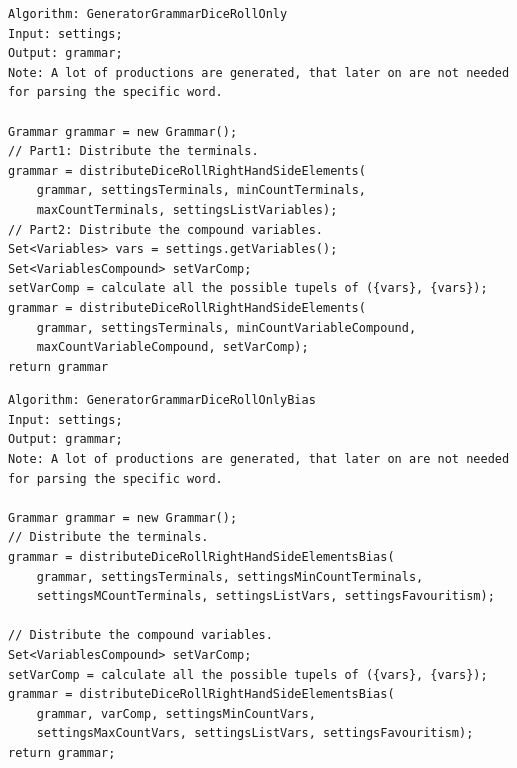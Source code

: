 \pagebreak


\lstset{language=java}
\begin{lstlisting}[frame=htrbl,caption={GeneratorGrammarDiceRollOnly}, 
label={lst:GeneratorGrammarDiceRollOnly}]
Algorithm: GeneratorGrammarDiceRollOnly
Input: settings;
Output: grammar;
Note: A lot of productions are generated, that later on are not needed
for parsing the specific word.

Grammar grammar = new Grammar();
// Part1: Distribute the terminals.
grammar = distributeDiceRollRightHandSideElements(
	grammar, settingsTerminals, minCountTerminals, 
	maxCountTerminals, settingsListVariables);
// Part2: Distribute the compound variables.
Set<Variables> vars = settings.getVariables();
Set<VariablesCompound> setVarComp;
setVarComp = calculate all the possible tupels of ({vars}, {vars});
grammar = distributeDiceRollRightHandSideElements(
	grammar, settingsTerminals, minCountVariableCompound, 
	maxCountVariableCompound, setVarComp);
return grammar
\end{lstlisting}

\pagebreak

\lstset{language=java}
\begin{lstlisting}[frame=htrbl,caption={GeneratorGrammarDiceRollOnlyBias}, 
label={lst:GeneratorGrammarDiceRollOnlyBias}]
Algorithm: GeneratorGrammarDiceRollOnlyBias
Input: settings;
Output: grammar;
Note: A lot of productions are generated, that later on are not needed
for parsing the specific word.

Grammar grammar = new Grammar();
// Distribute the terminals.
grammar = distributeDiceRollRightHandSideElementsBias(
	grammar, settingsTerminals, settingsMinCountTerminals, 
	settingsMCountTerminals, settingsListVars, settingsFavouritism);

// Distribute the compound variables.
Set<VariablesCompound> setVarComp;
setVarComp = calculate all the possible tupels of ({vars}, {vars});
grammar = distributeDiceRollRightHandSideElementsBias(
	grammar, varComp, settingsMinCountVars,
	settingsMaxCountVars, settingsListVars, settingsFavouritism);
return grammar;
\end{lstlisting}

\pagebreak

